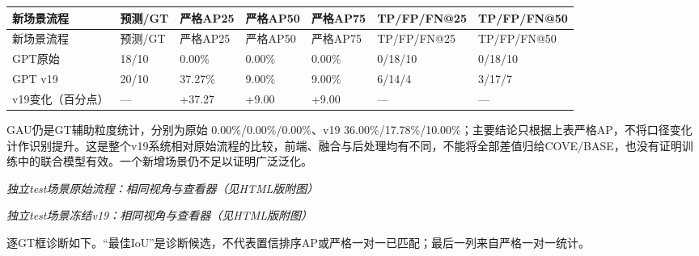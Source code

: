 \documentclass[UTF8,fontset=fandol]{ctexart}
\begin{document}
{\small
\begin{longtable}{|p{}|p{}|p{}|p{}|p{}|p{}|p{}|}
\hline
新场景流程 & 预测/GT & 严格AP25 & 严格AP50 & 严格AP75 & TP/FP/FN@25 & TP/FP/FN@50 \\ \hline
\endfirsthead
\hline
新场景流程 & 预测/GT & 严格AP25 & 严格AP50 & 严格AP75 & TP/FP/FN@25 & TP/FP/FN@50 \\ \hline
\endhead
GPT原始 & 18/10 & 0.00\% & 0.00\% & 0.00\% & 0/18/10 & 0/18/10 \\ \hline
GPT v19 & 20/10 & 37.27\% & 9.00\% & 9.00\% & 6/14/4 & 3/17/7 \\ \hline
v19变化（百分点） & — & +37.27 & +9.00 & +9.00 & — & — \\ \hline
\end{longtable}
}

GAU仍是GT辅助粒度统计，分别为原始 0.00\%/0.00\%/0.00\%、v19 36.00\%/17.78\%/10.00\%；主要结论只根据上表严格AP，不将口径变化计作识别提升。这是整个v19系统相对原始流程的比较，前端、融合与后处理均有不同，不能将全部差值归给COVE/BASE，也没有证明训练中的联合模型有效。一个新增场景仍不足以证明广泛泛化。



\textit{独立test场景原始流程：相同视角与查看器（见HTML版附图）}



\textit{独立test场景冻结v19：相同视角与查看器（见HTML版附图）}



逐GT框诊断如下。“最佳IoU”是诊断候选，不代表置信排序AP或严格一对一已匹配；最后一列来自严格一对一统计。
\end{document}
